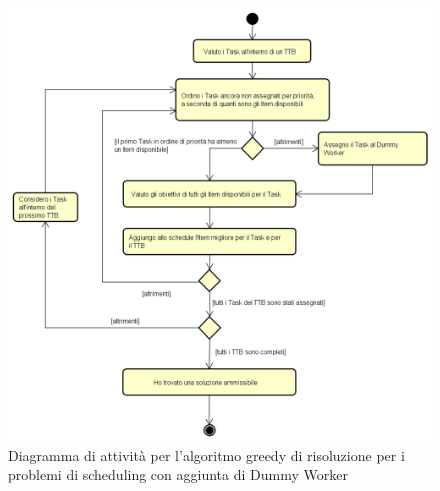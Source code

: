 \begin{figure}[!h]
    \begin{widepage}
        \includegraphics[width=14.9cm,keepaspectratio]{../immagini/algoritmo_dummy.png}
        \caption{Diagramma di attività per l'algoritmo greedy di risoluzione per i problemi di scheduling con aggiunta di Dummy Worker}
    \end{widepage}
\end{figure}